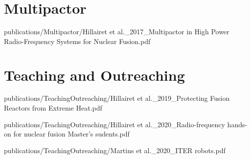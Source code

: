\documentclass[
fontsize=10pt, %
twoside=true, %
numbers=noenddot, %
]{kaobook}
\begin{document}
	\section{Multipactor}
	
		
		{publications/Multipactor/Hillairet et al._2017_Multipactor in High Power Radio-Frequency Systems for Nuclear Fusion.pdf}
	
	\section{Teaching and Outreaching}
	
			
		{publications/TeachingOutreaching/Hillairet et al._2019_Protecting Fusion Reactors from Extreme Heat.pdf}
		
		
		{publications/TeachingOutreaching/Hillairet et al._2020_Radio-frequency hands-on for nuclear fusion Master's sudents.pdf}
		
			
		{publications/TeachingOutreaching/Martins et al._2020_ITER robots.pdf}
	
	\fi
	

	


%	
%	
%	
%	
%	
%	
%	
%	
%	
	
\end{document}
